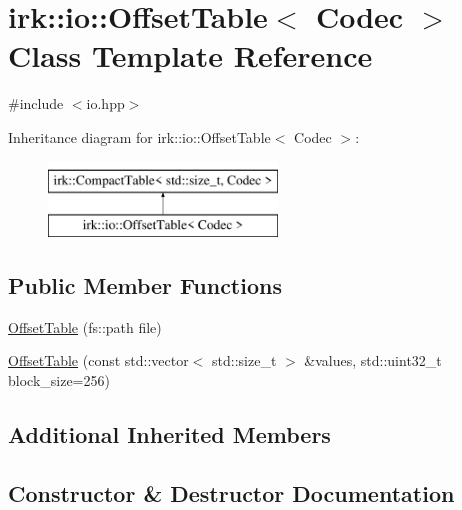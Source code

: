 \hypertarget{classirk_1_1io_1_1OffsetTable}{}\section{irk\+:\+:io\+:\+:Offset\+Table$<$ Codec $>$ Class Template Reference}
\label{classirk_1_1io_1_1OffsetTable}


{\ttfamily \#include $<$io.\+hpp$>$}

Inheritance diagram for irk\+:\+:io\+:\+:Offset\+Table$<$ Codec $>$\+:\begin{figure}[H]
\begin{center}
\leavevmode
\includegraphics[height=2.000000cm]{classirk_1_1io_1_1OffsetTable}
\end{center}
\end{figure}
\subsection*{Public Member Functions}
\begin{DoxyCompactItemize}
\item 
\mbox{\hyperlink{classirk_1_1io_1_1OffsetTable_a6d62ae797615b5472ccdb593d9332068}{Offset\+Table}} (fs\+::path file)
\item 
\mbox{\hyperlink{classirk_1_1io_1_1OffsetTable_a8aa12e4d3b60eb83f2979731b4d2c107}{Offset\+Table}} (const std\+::vector$<$ std\+::size\+\_\+t $>$ \&values, std\+::uint32\+\_\+t block\+\_\+size=256)
\end{DoxyCompactItemize}
\subsection*{Additional Inherited Members}


\subsection{Constructor \& Destructor Documentation}
\mbox{\label{classirk_1_1io_1_1OffsetTable_a6d62ae797615b5472ccdb593d9332068}} 
